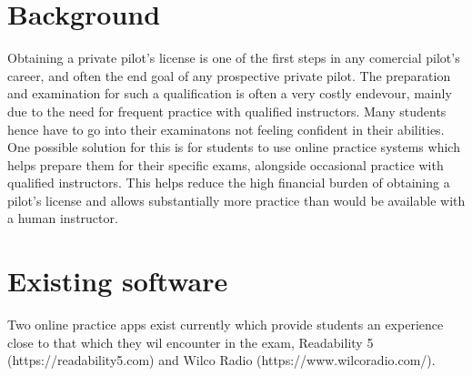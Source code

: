 \section{Background}
Obtaining a private pilot's license is one of the first steps in any comercial pilot's career, and often the end goal of any prospective private pilot.
The preparation and examination for such a qualification is often a very costly endevour, mainly due to the need for frequent practice with qualified instructors.
Many students hence have to go into their examinatons not feeling confident in their abilities.
\\
One possible solution for this is for students to use online practice systems which helps prepare them for their specific exams, alongside occasional practice with qualified instructors.
This helps reduce the high financial burden of obtaining a pilot's license and allows substantially more practice than would be available with a human instructor.
\section{Existing software}
Two online practice apps exist currently which provide students an experience close to that which they wil encounter in the exam, Readability 5 (https://readability5.com) and Wilco Radio (https://www.wilcoradio.com/).
